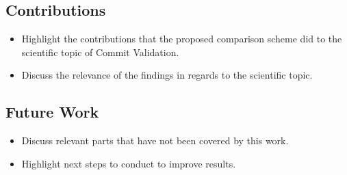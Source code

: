 \subsection{Contributions}
\begin{itemize}
	\item Highlight the contributions that the proposed comparison scheme did to the scientific topic of Commit Validation.
	\item Discuss the relevance of the findings in regards to the scientific topic.
\end{itemize}

\subsection{Future Work}
\begin{itemize}
	\item Discuss relevant parts that have not been covered by this work.
	\item Highlight next steps to conduct to improve results.
\end{itemize}
